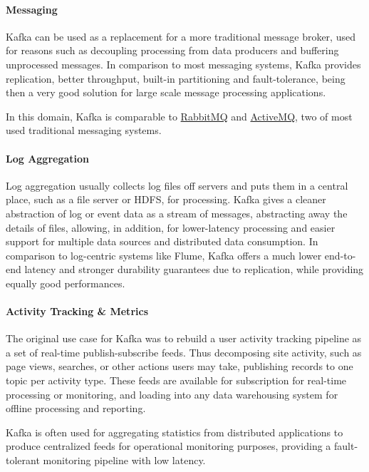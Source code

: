 \paragraph{Messaging}

Kafka can be used as a replacement for a more traditional message broker, used for reasons such as decoupling processing from data producers and buffering unprocessed messages. In comparison to most messaging systems, Kafka provides replication, better throughput, built-in partitioning and fault-tolerance, being then a very good solution for large scale message processing applications.

In this domain, Kafka is comparable to  \href{https://www.rabbitmq.com/}{RabbitMQ} and \href{http://activemq.apache.org/}{ActiveMQ}, two of most used traditional messaging systems.

\paragraph{Log Aggregation}

Log aggregation usually collects log files off servers and puts them in a central place, such as a file server or HDFS, for processing. Kafka gives a cleaner abstraction of log or event data as a stream of messages, abstracting away the details of files, allowing, in addition, for lower-latency processing and easier support for multiple data sources and distributed data consumption. In comparison to log-centric systems like Flume, Kafka offers a much lower end-to-end latency and stronger durability guarantees due to replication, while providing equally good performances. 
 
\paragraph{Activity Tracking \& Metrics}

The original use case for Kafka was to rebuild a user activity tracking pipeline as a set of real-time publish-subscribe feeds. Thus decomposing site activity, such as page views, searches, or other actions users may take, publishing records to one topic per activity type. These feeds are available for subscription for  real-time processing or monitoring, and loading into any data warehousing system for offline processing and reporting.

Kafka is often used for aggregating statistics from distributed applications to produce centralized feeds for operational monitoring purposes, providing a fault-tolerant monitoring pipeline with low latency.


